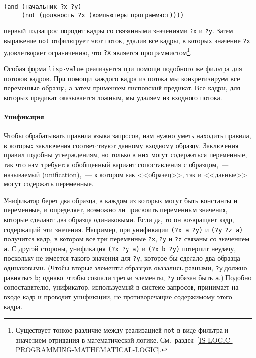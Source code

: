 \begin{Verbatim}[fontsize=\small]
(and (начальник ?x ?y)
     (not (должность ?x (компьютеры программист))))
\end{Verbatim}
первый подзапрос породит кадры со связанными значениями
{\tt ?x} и {\tt ?y}.  Затем выражение {\tt not}
отфильтрует этот поток, удалив все кадры, в которых значение
{\tt ?x} удовлетворяет ограничению, что {\tt ?x}
является программистом\footnote{Существует тонкое различие между реализацией
{\tt not} в виде фильтра и значением отрицания в математической
логике. См.~раздел~\ref{IS-LOGIC-PROGRAMMING-MATHEMATICAL-LOGIC}.}.

Особая форма {\tt lisp-value}
реализуется при
помощи подобного же фильтра для потоков кадров.  При помощи каждого
кадра из потока мы конкретизируем все переменные образца, а затем
применяем лисповский предикат.  Все кадры, для которых предикат
оказывается ложным, мы удаляем из входного потока.

\paragraph{Унификация}

Чтобы обрабатывать 
правила языка запросов, нам нужно
уметь находить правила, в которых заключения соответствуют данному
входному образцу.  Заключения правил подобны утверждениям, но только в
них могут содержаться переменные, так что нам требуется обобщенный
вариант сопоставления с образцом,~--- называемый 
 (unification),~--- в котором как
<<образец>>, так и <<данные>> могут содержать переменные.

Унификатор берет два образца, в каждом из которых могут
быть константы и переменные, и определяет, возможно ли присвоить
переменным значения, которые сделают два образца одинаковыми.  Если да,
то он возвращает кадр, содержащий эти значения.  Например, при
унификации {\tt (?x a ?y)} и {\tt (?y ?z a)} получится
кадр, в котором все три переменные {\tt ?x}, {\tt ?y} и
{\tt ?z} связаны со значением {\tt a}.  С другой
стороны, унификация {\tt (?x ?y a)} и {\tt (?x b ?y)}
потерпит неудачу, поскольку не имеется такого значения для
{\tt ?y}, которое бы сделало два образца одинаковыми.  (Чтобы
вторые элементы образцов оказались равными, {\tt ?y} должно
равняться {\tt b}; однако, чтобы совпали третьи элементы,
{\tt ?y} обязан быть {\tt a}.) Подобно сопоставителю,
унификатор, используемый в системе запросов, принимает на входе кадр и
проводит унификации, не противоречащие содержимому этого кадра.

